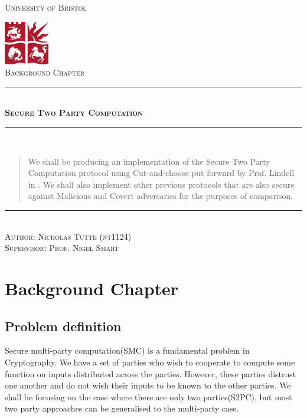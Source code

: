 \documentclass[a4paper,10pt]{article}
\newcommand{\HRule}{\rule{\linewidth}{0.5mm}}
\begin{document}
	\begin{titlepage}
		\begin{center}

			\textsc{\LARGE University of Bristol}
			\vspace{2cm}
    
			\includegraphics[width=0.15\textwidth]{./bristolunilogo}~\\[1cm]
    
			\textsc{\Large Background Chapter}
    
			\vspace{3cm}
			\HRule \\[0.4cm]
			\textsc{ \huge \bfseries Secure Two Party Computation}
			\HRule \\[0.4cm]
			\vspace{2cm}
    
			\begin{abstract}
				We shall be producing an implementation of the Secure Two Party Computation protocol using Cut-and-choose put forward by Prof. Lindell in \cite{Lindell_CnC_2014}. We shall also implement other previous protocols that are also secure against Malicious and Covert adversaries for the purposes of comparison.
			\end{abstract}
    
			\vspace{3cm}
			\noindent\rule{12cm}{0.2pt}\\[0.2cm]
			\textsc{\Large Author: Nicholas Tutte (nt1124)}\\[0.2cm]
			\textsc{\Large Supervisor: Prof. Nigel Smart}
    
		\end{center}
	\end{titlepage}

	\section{Background Chapter}
		\subsection{Problem definition} \label{InformalProbDef}
			Secure multi-party computation(SMC) is a fundamental problem in Cryptography. We have a set of parties who wish to cooperate to compute some function on inputs distributed across the parties. However, these parties distrust one another and do not wish their inputs to be known to the other parties. We shall be focusing on the case where there are only two parties(S2PC), but most two party approaches can be generalised to the multi-party case.\\
      
\end{document}
